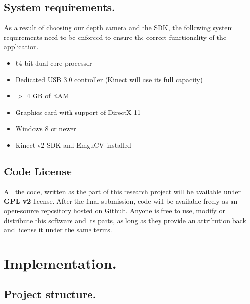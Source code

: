 \documentclass[a4paper,11pt,oneside]{article}
\begin{document}
\subsection{System requirements.}

As a result of choosing our depth camera and the SDK, the following system requirements need to be enforced to ensure the correct functionality of the application.

  \begin{itemize}
  \item 64-bit dual-core processor
  \item Dedicated USB 3.0 controller (Kinect will use its full capacity)
  \item $>$ 4 GB of RAM
  \item Graphics card with support of DirectX 11
  \item Windows 8 or newer
 \item Kinect v2 SDK and EmguCV installed
  \end{itemize}

  \subsection{Code License}
  
  All the code, written as the part of this research project will be available under \textbf{GPL v2} license. After the final submission, code will be available freely as an open-source repository hosted on Github. Anyone is free to use, modify or distribute this software and its parts, as long as they provide an attribution back and license it under the same terms.

 \section{Implementation.}

\subsection{Project structure.}
\end{document}
